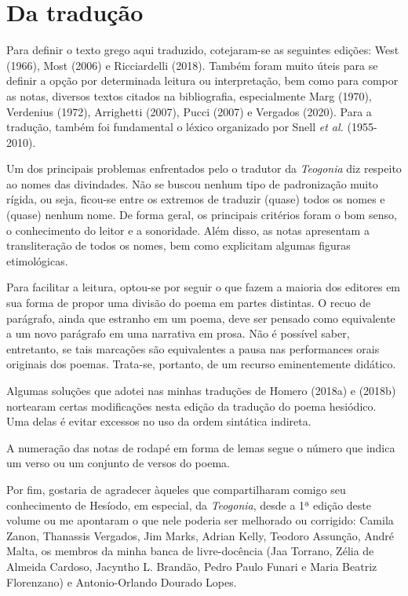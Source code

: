 \section{Da tradução}

Para definir o texto grego aqui traduzido, cotejaram-se as seguintes
edições: West (1966), Most (2006) e Ricciardelli (2018). Também foram
muito úteis para se definir a opção por determinada leitura ou
interpretação, bem como para compor as notas, diversos textos citados na
bibliografia, especialmente Marg (1970), Verdenius (1972), Arrighetti
(2007), Pucci (2007) e Vergados (2020). Para a tradução, também foi
fundamental o léxico organizado por Snell \emph{et al.} (1955-2010).

Um dos principais problemas enfrentados pelo o tradutor da
\emph{Teogonia} diz respeito ao nomes das divindades. Não se buscou
nenhum tipo de padronização muito rígida, ou seja, ficou-se entre os
extremos de traduzir (quase) todos os nomes e (quase) nenhum nome. De
forma geral, os principais critérios foram o bom senso, o conhecimento
do leitor e a sonoridade. Além disso, as notas apresentam a
transliteração de todos os nomes, bem como explicitam algumas figuras
etimológicas.

Para facilitar a leitura, optou-se por seguir o que fazem a maioria dos
editores em sua forma de propor uma divisão do poema em partes
distintas. O recuo de parágrafo, ainda que estranho em um poema, deve
ser pensado como equivalente a um novo parágrafo em uma narrativa em
prosa. Não é possível saber, entretanto, se tais marcações são
equivalentes a pausa nas performances orais originais dos poemas.
Trata-se, portanto, de um recurso eminentemente didático.

Algumas soluções que adotei nas minhas traduções de Homero (2018a) e
(2018b) nortearam certas modificações nesta edição da tradução do poema
hesiódico. Uma delas é evitar excessos no uso da ordem sintática
indireta.

A numeração das notas de rodapé em forma de lemas segue o número que
indica um verso ou um conjunto de versos do poema.

Por fim, gostaria de agradecer àqueles que compartilharam comigo seu
conhecimento de Hesíodo, em especial, da \emph{Teogonia}, desde a 1ª
edição deste volume ou me apontaram o que nele poderia ser melhorado ou
corrigido: Camila Zanon, Thanassis Vergados, Jim Marks, Adrian Kelly,
Teodoro Assunção, André Malta, os membros da minha banca de
livre-docência (Jaa Torrano, Zélia de Almeida Cardoso, Jacyntho L.
Brandão, Pedro Paulo Funari e Maria Beatriz Florenzano) e
Antonio-Orlando Dourado Lopes.


